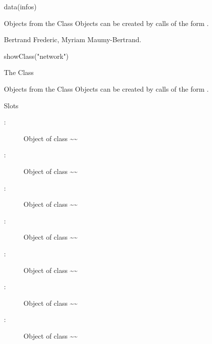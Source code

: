 \documentclass[a4paper]{book}
\begin{document}
%
\begin{Examples}
\begin{ExampleCode}
data(infos)
\end{ExampleCode}
\end{Examples}
%
\begin{Description}
\end{Description}
%
\begin{Section}{Objects from the Class}
Objects can be created by calls of the form .
\end{Section}
%
\begin{Author}\relax
Bertrand Frederic, Myriam Maumy-Bertrand.
\end{Author}
%
\begin{Examples}
\begin{ExampleCode}
showClass("network")
\end{ExampleCode}
\end{Examples}
%
\begin{Description}\relax
The Class
\end{Description}
%
\begin{Section}{Objects from the Class}
Objects can be created by calls of the form .

\end{Section}
%
\begin{Section}{Slots}
\begin{description}

\item[:] Object of class  \textasciitilde{}\textasciitilde{} 
\item[:] Object of class  \textasciitilde{}\textasciitilde{} 
\item[:] Object of class  \textasciitilde{}\textasciitilde{} 
\item[:] Object of class  \textasciitilde{}\textasciitilde{} 
\item[:] Object of class  \textasciitilde{}\textasciitilde{} 
\item[:] Object of class  \textasciitilde{}\textasciitilde{} 
\item[:] Object of class  \textasciitilde{}\textasciitilde{} 

\end{description}

\end{Section}
\end{document}

